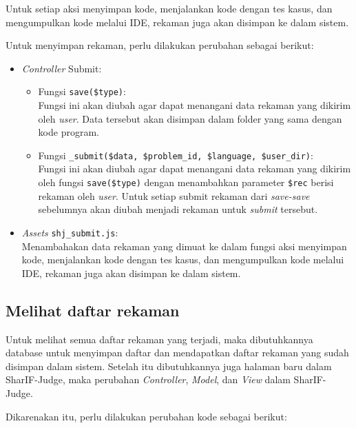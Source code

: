 Untuk setiap aksi menyimpan kode, menjalankan kode dengan tes kasus, dan mengumpulkan kode melalui IDE, rekaman juga akan disimpan ke dalam sistem.

Untuk menyimpan rekaman, perlu dilakukan perubahan sebagai berikut:

\begin{itemize}
    \item \textit{Controller} Submit:
        \begin{itemize}
            \item Fungsi \verb|save($type)|: \\
            Fungsi ini akan diubah agar dapat menangani data rekaman yang dikirim oleh \textit{user}. Data tersebut akan disimpan dalam folder yang sama dengan kode program.
            \item Fungsi \verb|_submit($data, $problem_id, $language, $user_dir)|: \\
            Fungsi ini akan diubah agar dapat menangani data rekaman yang dikirim oleh fungsi \verb|save($type)| dengan menambahkan parameter \verb|$rec| berisi rekaman oleh \textit{user}. Untuk setiap submit rekaman dari \textit{save-save} sebelumnya akan diubah menjadi rekaman untuk \textit{submit} tersebut.
        \end{itemize}
    \item \textit{Assets} \verb|shj_submit.js|: \\
        Menambahakan data rekaman yang dimuat ke dalam fungsi aksi menyimpan kode, menjalankan kode dengan tes kasus, dan mengumpulkan kode melalui IDE, rekaman juga akan disimpan ke dalam sistem.
\end{itemize}

\subsection{Melihat daftar rekaman}
\label{sub:4:3:melihatdaftarrekaman}

Untuk melihat semua daftar rekaman yang terjadi, maka dibutuhkannya database untuk menyimpan daftar dan mendapatkan daftar rekaman yang sudah disimpan dalam sistem. Setelah itu dibutuhkannya juga halaman baru dalam SharIF-Judge, maka perubahan \textit{Controller}, \textit{Model}, dan \textit{View} dalam SharIF-Judge.

Dikarenakan itu, perlu dilakukan perubahan kode sebagai berikut:

